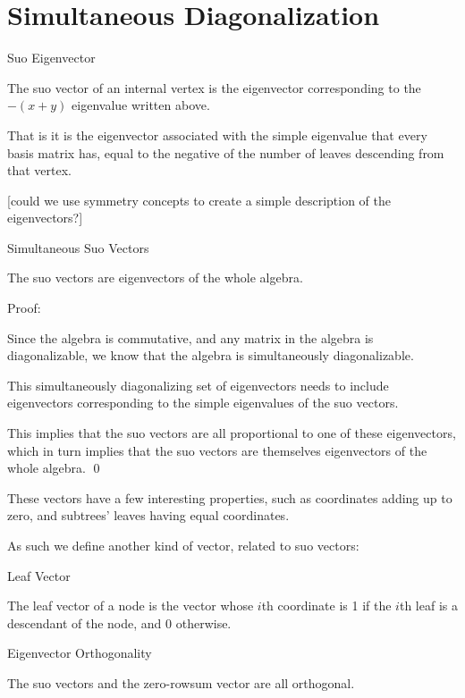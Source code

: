 \documentclass[10pt,a4paper]{report}
\begin{document}
\section{Simultaneous Diagonalization}

\begin{definition} Suo Eigenvector

	The suo vector of an internal vertex is the eigenvector corresponding to
	the $-(x+y)$ eigenvalue written above.

	That is it is the eigenvector associated with the simple eigenvalue that
	every basis matrix has, equal to the negative of the number of leaves
	descending from that vertex.
\end{definition}

[could we use symmetry concepts to create a simple description of the eigenvectors?]

\begin{lemma} Simultaneous Suo Vectors

	The suo vectors are eigenvectors of the whole algebra.
\end{lemma}
Proof:

Since the algebra is commutative, and any matrix in the algebra is
diagonalizable, we know that the algebra is simultaneously diagonalizable.

This simultaneously diagonalizing set of eigenvectors needs to include
eigenvectors corresponding to the simple eigenvalues of the suo vectors.

This implies that the suo vectors are all proportional to one of these
eigenvectors, which in turn implies that the suo vectors are themselves
eigenvectors of the whole algebra. \qed

These vectors have a few interesting properties, such as coordinates adding up
to zero, and subtrees' leaves having equal coordinates.

As such we define another kind of vector, related to suo vectors:

\begin{definition} Leaf Vector

	The leaf vector of a node is the vector whose $i$th coordinate is 1 if the
	$i$th leaf is a descendant of the node, and 0 otherwise.
\end{definition}

\begin{lemma} Eigenvector Orthogonality

	The suo vectors and the zero-rowsum vector are all orthogonal.
\end{lemma}
\end{document}
